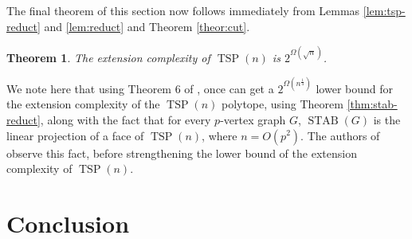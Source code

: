 \documentclass{article}
\newtheorem{theorem}{\sc Theorem}
\theoremstyle{definition}
\theoremstyle{remark}
\newcommand{\TSP}{\operatorname{TSP}}
\newcommand{\STAB}{\operatorname{STAB}}
\begin{document}
The final theorem of this section now follows immediately from Lemmas \ref{lem:tsp-reduct} and \ref{lem:reduct} and Theorem \ref{theor:cut}.

\begin{theorem}
The extension complexity of $\TSP(n)$ is $2^{\Omega\left(\sqrt{n}\right)}$.
\end{theorem}

We note here that using Theorem $6$ of \cite{Yannakakis}, once can get a $2^{\Omega\left(n^{\frac{1}{4}}\right)}$ lower bound for the extension complexity of the $\TSP(n)$ polytope, using Theorem \ref{thm:stab-reduct}, along with the fact that for every $p$-vertex graph $G$, $\STAB(G)$ is the linear projection of a face of $\TSP(n)$, where $n = O(p^2)$. The authors of \cite{fiorini} observe this fact, before strengthening the lower bound of the extension complexity of $\TSP(n)$.

\section{Conclusion}



\end{document}
